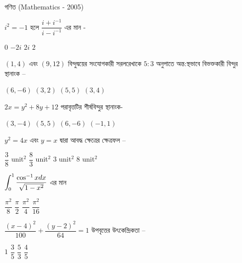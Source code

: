 \documentclass[addpoints]{exam}
\begin{document}
\begin{LARGE}
\begin{center}
গণিত (Mathematics - 2005)
\end{center}
\end{LARGE}
\begin{questions}

\question  $ i^{2}=-1 $ হলে $ \dfrac{i+i^{-1}}{i-i^{-1}} $ এর মান - 

\begin{oneparchoices}
\choice $ 0 $
\choice $ -2i $
\choice $ 2i $
\choice $ 2 $
\end{oneparchoices}


\question $ (1,4) $ এবং $ (9,12) $ বিন্দুদ্বয়ের সংযোগকারী সরলরেখাকে $ 5:3 $ অনুপাতে অন্ত:স্থভাবে বিভক্তকারী বিন্দুর স্থানাংক –

\begin{oneparchoices}
\choice $ (6,-6) $
\choice $ (3,2) $
\choice $ (5, 5) $
\choice $ (3,4) $
\end{oneparchoices}

\question $ 2x=y^{2}+8y+12 $ পরাবৃত্তটির শীর্ষবিন্দুর স্থানাংক-

\begin{oneparchoices}
\choice $ (3,-4) $
\choice $ (5,5) $
\choice $ (6, -6) $
\choice $ (-1,1) $
\end{oneparchoices}

\question  $ y^{2}=4x $ এবং $ y=x $ দ্বারা আবদ্ধ ক্ষেত্রের ক্ষেত্রফল – 

\begin{oneparchoices}
\choice $ \dfrac{3}{8} $ unit$ ^{2} $
\choice $ \dfrac{8}{3} $ unit$ ^{2} $
\choice $ 3 $ unit$ ^{2} $
\choice $ 8 $ unit$ ^{2} $
\end{oneparchoices}

\question  $ \mathlarger{\int_{0}^{1}\dfrac{\cos^{-1} xdx}{\sqrt{1-x^{2}}}}  $  এর মান

\begin{oneparchoices}
\choice $ \dfrac{\pi^{2}}{8} $
\choice $ \dfrac{\pi}{2} $
\choice $ \dfrac{\pi^{2}}{4} $
\choice $ \dfrac{\pi^{2}}{16} $
\end{oneparchoices}

\question $ \dfrac{(x-4)^{2}}{100} + \dfrac{(y-2)^{2}}{64} = 1 $ উপবৃত্তের উৎকেন্দ্রিকতা – 

\begin{oneparchoices}
\choice $ 1 $
\choice $ \dfrac{3}{5} $
\choice $ \dfrac{5}{3} $
\choice $ \dfrac{4}{5} $
\end{oneparchoices}


\end{questions}
\end{document}
